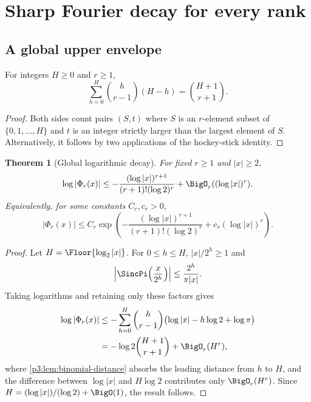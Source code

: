 \documentclass[11pt,oneside]{article}
\newtheorem{theorem}{Theorem}[section]
\theoremstyle{definition}
\theoremstyle{remark}
\begin{document}
\section{Sharp Fourier decay for every rank}\label{p3:sec:fourier}

\subsection{A global upper envelope}

\begin{lemma}\label{p3:lem:binomial-distance}
For integers $H\ge0$ and $r\ge1$,
\begin{equation}\label{p3:eq:binomial-distance}
 \sum_{h=0}^{H}\binom h{r-1}(H-h)=\binom{H+1}{r+1}.
\end{equation}
\end{lemma}

\begin{proof}
Both sides count pairs $(S,t)$ where $S$ is an $r$-element subset of
$\{0,1,\ldots,H\}$ and $t$ is an integer strictly larger than the largest element of $S$.  Alternatively, it follows by two applications of the hockey-stick identity.
\end{proof}

\begin{theorem}[Global logarithmic decay]\label{p3:thm:global-fourier-decay}
For fixed $r\ge1$ and $|x|\ge2$,
\begin{equation}\label{p3:eq:global-fourier-decay}
 \log|\Phi_r(x)|
 \le -\frac{(\log|x|)^{r+1}}
 {(r+1)!(\log2)^r}
 +\BigO_r((\log|x|)^r).
\end{equation}
Equivalently, for some constants $C_r,c_r>0$,
\begin{equation}\label{p3:eq:global-fourier-exp}
 |\Phi_r(x)|
 \le C_r\exp\!\left(
 -\frac{(\log|x|)^{r+1}}
 {(r+1)!(\log2)^r}
 +c_r(\log|x|)^r\right).
\end{equation}
\end{theorem}

\begin{proof}
Let $H=\Floor{\log_2|x|}$.  For $0\le h\le H$,
$|x|/2^h\ge1$ and
\[
 \left|\SincPi\!\left(\frac x{2^h}\right)\right|
 \le\frac{2^h}{\pi|x|}.
\]
Taking logarithms and retaining only these factors gives
\begin{align*}
 \log|\Phi_r(x)|
 &\le -\sum_{h=0}^{H}\binom h{r-1}
   \bigl(\log|x|-h\log2+\log\pi\bigr)\\
 &=-\log2\binom{H+1}{r+1}+\BigO_r(H^r),
\end{align*}
where \cref{p3:lem:binomial-distance} absorbs the leading distance from $h$ to $H$, and the difference between $\log|x|$ and $H\log2$ contributes only $\BigO_r(H^r)$.  Since $H=(\log|x|)/(\log2)+\BigO(1)$, the result follows.
\end{proof}
\end{document}
